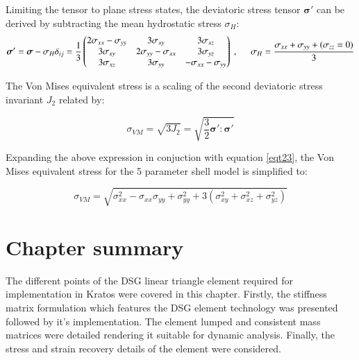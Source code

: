 Limiting the tensor to plane stress states, the deviatoric stress tensor $\boldsymbol{\sigma}'$ can be derived by subtracting the mean hydrostatic stress $\sigma_{H}$:
\begin{equation} 
\boldsymbol{\sigma}' = \boldsymbol{\sigma} - \sigma_{H} \delta_{ij} = 
\frac{1}{3}
\begin{pmatrix}
2\sigma_{xx}-\sigma_{yy} & 3\sigma_{xy} & 3\sigma_{xz} \\
3\sigma_{xy} & 2\sigma_{yy}-\sigma_{xx} & 3\sigma_{yz} \\
3\sigma_{xz} & 3\sigma_{yy} & -\sigma_{xx}-\sigma_{yy} \\
\end{pmatrix}\ ,
\hspace{5mm}
\sigma_{H} = \frac{\sigma_{xx} + \sigma_{yy} + (\sigma_{zz} = 0)}{3}
\label{eqt23}
\end{equation}

The Von Mises equivalent stress is a scaling of the second deviatoric stress invariant $J_2$ related by:

\begin{equation} 
\sigma_{VM} = \sqrt{3J_2} = \sqrt{\frac{3}{2}\boldsymbol{\sigma}' : \boldsymbol{\sigma}'}
\label{eqt24}
\end{equation}

Expanding the above expression in conjuction with equation \ref{eqt23}, the Von Mises equivalent stress for the 5 parameter shell model is simplified to:

\begin{equation} 
\sigma_{VM} = 
\sqrt{
\sigma_{xx}^2
- \sigma_{xx}\sigma_{yy}
+ \sigma_{yy}^2
+ 3(\sigma_{xy}^2 + \sigma_{xz}^2 + \sigma_{yz}^2)
}
\label{eqt25}
\end{equation}

\section{Chapter summary}
The different points of the DSG linear triangle element required for implementation in Kratos were covered in this chapter. Firstly, the stiffness matrix formulation which features the DSG element technology was presented followed by it's implementation. The element lumped and consistent mass matrices were detailed rendering it suitable for dynamic analysis. Finally, the stress and strain recovery details of the element were considered.